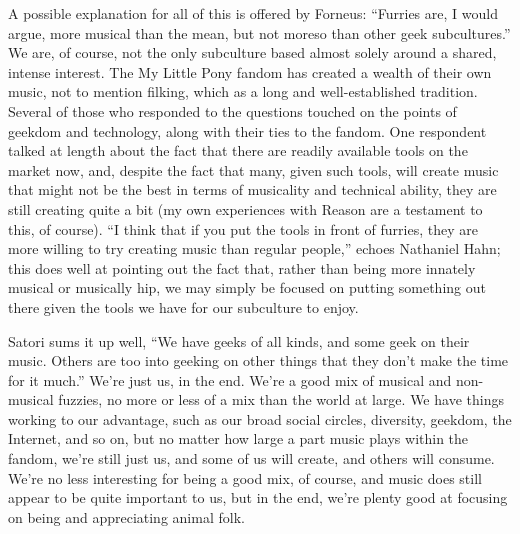 A possible explanation for all of this is offered by Forneus: ``Furries are, I would argue, more musical than the mean, but not moreso than other geek subcultures.'' We are, of course, not the only subculture based almost solely around a shared, intense interest. The My Little Pony fandom has created a wealth of their own music, not to mention filking, which as a long and well-established tradition. Several of those who responded to the questions touched on the points of geekdom and technology, along with their ties to the fandom. One respondent talked at length about the fact that there are readily available tools on the market now, and, despite the fact that many, given such tools, will create music that might not be the best in terms of musicality and technical ability, they are still creating quite a bit (my own experiences with Reason are a testament to this, of course). ``I think that if you put the tools in front of furries, they are more willing to try creating music than regular people,'' echoes Nathaniel Hahn; this does well at pointing out the fact that, rather than being more innately musical or musically hip, we may simply be focused on putting something out there given the tools we have for our subculture to enjoy.

Satori sums it up well, ``We have geeks of all kinds, and some geek on their music. Others are too into geeking on other things that they don't make the time for it much.'' We're just us, in the end. We're a good mix of musical and non-musical fuzzies, no more or less of a mix than the world at large. We have things working to our advantage, such as our broad social circles, diversity, geekdom, the Internet, and so on, but no matter how large a part music plays within the fandom, we're still just us, and some of us will create, and others will consume. We're no less interesting for being a good mix, of course, and music does still appear to be quite important to us, but in the end, we're plenty good at focusing on being and appreciating animal folk.
